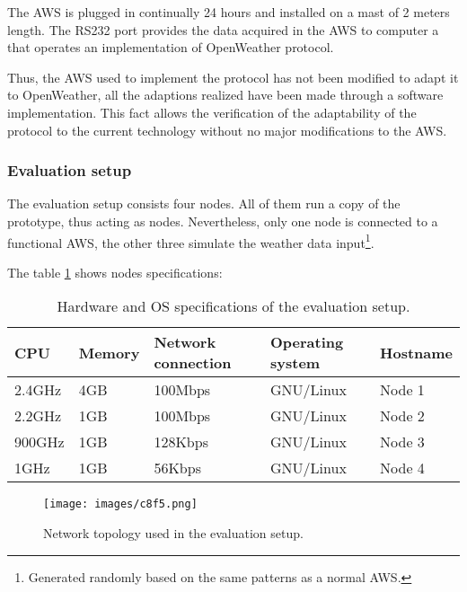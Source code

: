 The \gls{AWS} is plugged in continually 24 hours and installed on a mast of 2 meters length. The \gls{RS232} port provides the data acquired in the \gls{AWS} to computer a that operates an implementation of OpenWeather protocol.

Thus, the \gls{AWS} used to implement the protocol has not been modified to adapt it to OpenWeather, all the adaptions realized have been made through a software implementation. This fact allows the verification of the adaptability of the protocol to the current technology without no major modifications to the \gls{AWS}.

\subsubsection{Evaluation setup}

The evaluation setup consists four nodes. All of them run a copy of the prototype, thus acting as nodes.
Nevertheless, only one node is connected to a functional \gls{AWS}, the other three simulate the weather data input\footnote{Generated randomly based on the same patterns as a normal \gls{AWS}.}.

The table \ref{t8.1} shows nodes specifications:

\begin{table}[h]
\centering

    \begin{tabular}{ | l | l | l | l | l |}
    \hline
    \textbf{CPU} & \textbf{Memory} & \textbf{Network connection} & \textbf{Operating  system}  & \textbf{Hostname} \\ \hline
	2.4GHz & 4GB & 100Mbps & GNU/Linux & Node 1 \\ \hline
	2.2GHz & 1GB & 100Mbps & GNU/Linux & Node 2  \\ \hline
	900GHz & 1GB &128Kbps & GNU/Linux & Node 3 \\ \hline
	1GHz & 1GB & 56Kbps  & GNU/Linux & Node 4 \\ \hline


\end{tabular}
  \caption{Hardware and \protect \gls{OS} specifications of the evaluation setup.}
  \label{t8.1}
\end{table}

\begin{figure}[H]
\centerline{\texttt{[image: images/c8f5.png]}}
\caption{Network topology used in the evaluation setup.}
\end{figure}

